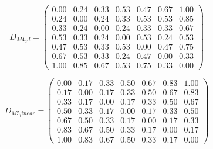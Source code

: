 \begin{table}[htbp]
\begin{equation}
D_{M4_2d} = \begin{pmatrix}0.00 & 0.24 & 0.33 & 0.53 & 0.47 & 0.67 & 1.00 \\ 0.24 & 0.00 & 0.24 & 0.33 & 0.53 & 0.53 & 0.85 \\ 0.33 & 0.24 & 0.00 & 0.24 & 0.33 & 0.33 & 0.67 \\ 0.53 & 0.33 & 0.24 & 0.00 & 0.53 & 0.24 & 0.53 \\ 0.47 & 0.53 & 0.33 & 0.53 & 0.00 & 0.47 & 0.75 \\ 0.67 & 0.53 & 0.33 & 0.24 & 0.47 & 0.00 & 0.33 \\ 1.00 & 0.85 & 0.67 & 0.53 & 0.75 & 0.33 & 0.00\end{pmatrix}
\end{equation}

\begin{equation}
D_{M5_linear} = \begin{pmatrix}0.00 & 0.17 & 0.33 & 0.50 & 0.67 & 0.83 & 1.00 \\ 0.17 & 0.00 & 0.17 & 0.33 & 0.50 & 0.67 & 0.83 \\ 0.33 & 0.17 & 0.00 & 0.17 & 0.33 & 0.50 & 0.67 \\ 0.50 & 0.33 & 0.17 & 0.00 & 0.17 & 0.33 & 0.50 \\ 0.67 & 0.50 & 0.33 & 0.17 & 0.00 & 0.17 & 0.33 \\ 0.83 & 0.67 & 0.50 & 0.33 & 0.17 & 0.00 & 0.17 \\ 1.00 & 0.83 & 0.67 & 0.50 & 0.33 & 0.17 & 0.00\end{pmatrix}
\end{equation}
\end{table}